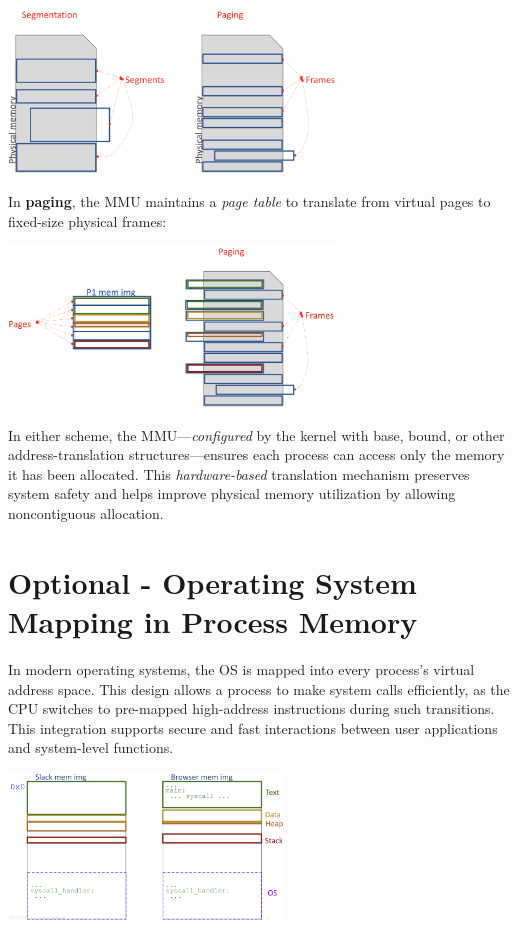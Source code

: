 \begin{center}
  \includegraphics[width=0.65\textwidth]{chapters/L4/images/page-segment.png}
\end{center}

\noindent In \textbf{paging}, the MMU maintains a \emph{page table} to translate from virtual pages to fixed-size physical frames:

\begin{center}
  \includegraphics[width=0.65\textwidth]{chapters/L4/images/paging.png}
\end{center}

\noindent In either scheme, the MMU---\emph{configured} by the kernel with base, bound, or other address-translation structures---ensures each process can access only the memory it has been allocated. This \emph{hardware-based} translation mechanism preserves system safety and helps improve physical memory utilization by allowing noncontiguous allocation.
\newpage
\section{Optional - Operating System Mapping in Process Memory}
In modern operating systems, the OS is mapped into every process's virtual address space. This design allows a process to make system calls efficiently, as the CPU switches to pre-mapped high-address instructions during such transitions. This integration supports secure and fast interactions between user applications and system-level functions.

\begin{center}
  \includegraphics[width=0.55\textwidth]{chapters/L4/images/os-everywhere.png}
\end{center}

